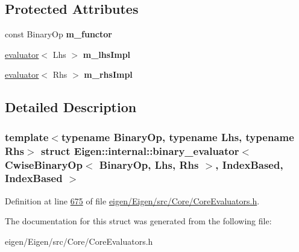 \subsection*{Protected Attributes}
\begin{DoxyCompactItemize}
\item 
\mbox{\label{struct_eigen_1_1internal_1_1binary__evaluator_3_01_cwise_binary_op_3_01_binary_op_00_01_lhs_00_009c1543c08828196fc8ade7d79a56c66_ac4358c660a7d509e25be0c2f05aa88d9}} 
const Binary\+Op {\bfseries m\+\_\+functor}
\item 
\mbox{\label{struct_eigen_1_1internal_1_1binary__evaluator_3_01_cwise_binary_op_3_01_binary_op_00_01_lhs_00_009c1543c08828196fc8ade7d79a56c66_a36d68450239299ef8be29b4dcaf234d6}} 
\hyperlink{struct_eigen_1_1internal_1_1evaluator}{evaluator}$<$ Lhs $>$ {\bfseries m\+\_\+lhs\+Impl}
\item 
\mbox{\label{struct_eigen_1_1internal_1_1binary__evaluator_3_01_cwise_binary_op_3_01_binary_op_00_01_lhs_00_009c1543c08828196fc8ade7d79a56c66_ab6063b1ccac816f8c558b8c852504325}} 
\hyperlink{struct_eigen_1_1internal_1_1evaluator}{evaluator}$<$ Rhs $>$ {\bfseries m\+\_\+rhs\+Impl}
\end{DoxyCompactItemize}


\subsection{Detailed Description}
\subsubsection*{template$<$typename Binary\+Op, typename Lhs, typename Rhs$>$\newline
struct Eigen\+::internal\+::binary\+\_\+evaluator$<$ Cwise\+Binary\+Op$<$ Binary\+Op, Lhs, Rhs $>$, Index\+Based, Index\+Based $>$}



Definition at line \hyperlink{eigen_2_eigen_2src_2_core_2_core_evaluators_8h_source_l00675}{675} of file \hyperlink{eigen_2_eigen_2src_2_core_2_core_evaluators_8h_source}{eigen/\+Eigen/src/\+Core/\+Core\+Evaluators.\+h}.



The documentation for this struct was generated from the following file\+:\begin{DoxyCompactItemize}
\item 
eigen/\+Eigen/src/\+Core/\+Core\+Evaluators.\+h\end{DoxyCompactItemize}
